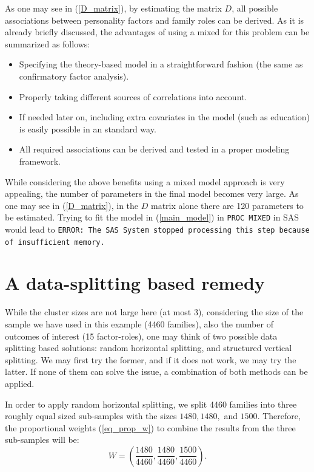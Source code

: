 \documentclass[11pt,a5paper,twoside]{book}
\begin{document}
As one may see in (\ref{D_matrix}), by estimating the matrix $D$, all possible associations between personality factors and family roles can be derived. As it is already briefly discussed, the advantages of using a mixed for this problem can be summarized as follows:
\begin{itemize}
\item Specifying the theory-based model in a straightforward fashion (the same as confirmatory factor analysis).
\item Properly taking different sources of correlations into account.
\item If needed later on, including extra covariates in the model (such as education) is easily possible in an standard way.
\item All required associations can be derived and tested in a proper modeling framework.
\end{itemize}

While considering the above benefits using a mixed model approach is very appealing, the number of parameters in the final model becomes very large. As one may see in (\ref{D_matrix}), in the $D$ matrix alone there are 120 parameters to be estimated. Trying to fit the model in (\ref{main_model}) in {\tt{PROC MIXED}} in SAS would lead to {\tt{ERROR: The SAS System stopped processing this step because of insufficient memory.\\}} 


\section{A data-splitting based remedy}

While the cluster sizes are not large here (at most 3), considering the size of the sample we have used in this example (4460 families), also the number of outcomes of interest (15 factor-roles), one may think of two possible data splitting based solutions: random horizontal splitting, and structured vertical splitting. We may first try the former, and if it does not work, we may try the latter. If none of them can solve the issue, a combination of both methods can be applied. 


In order to apply random horizontal splitting, we split 4460 families into three roughly equal sized sub-samples with 
the sizes $1480,1480,$ and $1500$. Therefore, the proportional weights (\ref{eq_prop_w}) to combine the results from the three sub-samples will be:
\begin{equation}
\label{prop_weights}
W=(\frac{1480}{4460},\frac{1480}{4460},\frac{1500}{4460}).
\end{equation}
\end{document}
